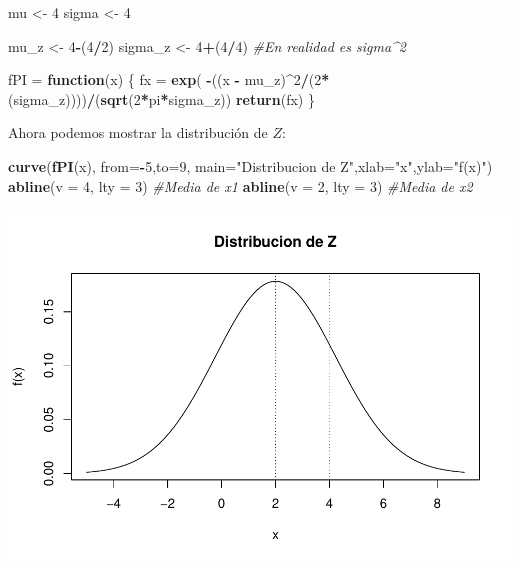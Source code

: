 \documentclass[
]{article}
\newenvironment{Shaded}{\begin{snugshade}}{\end{snugshade}}
\newcommand{\AttributeTok}[1]{\textcolor[rgb]{0.13,0.29,0.53}{#1}}
\newcommand{\CommentTok}[1]{\textcolor[rgb]{0.56,0.35,0.01}{\textit{#1}}}
\newcommand{\ControlFlowTok}[1]{\textcolor[rgb]{0.13,0.29,0.53}{\textbf{#1}}}
\newcommand{\DecValTok}[1]{\textcolor[rgb]{0.00,0.00,0.81}{#1}}
\newcommand{\FunctionTok}[1]{\textcolor[rgb]{0.13,0.29,0.53}{\textbf{#1}}}
\newcommand{\NormalTok}[1]{#1}
\newcommand{\OtherTok}[1]{\textcolor[rgb]{0.56,0.35,0.01}{#1}}
\newcommand{\SpecialCharTok}[1]{\textcolor[rgb]{0.81,0.36,0.00}{\textbf{#1}}}
\newcommand{\StringTok}[1]{\textcolor[rgb]{0.31,0.60,0.02}{#1}}
\begin{document}
\begin{Shaded}
\begin{Highlighting}[]
\NormalTok{mu }\OtherTok{\textless{}{-}} \DecValTok{4}
\NormalTok{sigma }\OtherTok{\textless{}{-}} \DecValTok{4}

\NormalTok{mu\_z }\OtherTok{\textless{}{-}} \DecValTok{4}\SpecialCharTok{{-}}\NormalTok{(}\DecValTok{4}\SpecialCharTok{/}\DecValTok{2}\NormalTok{)}
\NormalTok{sigma\_z }\OtherTok{\textless{}{-}} \DecValTok{4}\SpecialCharTok{+}\NormalTok{(}\DecValTok{4}\SpecialCharTok{/}\DecValTok{4}\NormalTok{) }\CommentTok{\#En realidad es sigma\^{}2}

\NormalTok{fPI }\OtherTok{=} \ControlFlowTok{function}\NormalTok{(x)}
\NormalTok{\{}
\NormalTok{  fx }\OtherTok{=} \FunctionTok{exp}\NormalTok{( }\SpecialCharTok{{-}}\NormalTok{((x }\SpecialCharTok{{-}}\NormalTok{ mu\_z)}\SpecialCharTok{\^{}}\DecValTok{2}\SpecialCharTok{/}\NormalTok{(}\DecValTok{2}\SpecialCharTok{*}\NormalTok{(sigma\_z))))}\SpecialCharTok{/}\NormalTok{(}\FunctionTok{sqrt}\NormalTok{(}\DecValTok{2}\SpecialCharTok{*}\NormalTok{pi}\SpecialCharTok{*}\NormalTok{sigma\_z))}
  \FunctionTok{return}\NormalTok{(fx)}
\NormalTok{\}}
\end{Highlighting}
\end{Shaded}

Ahora podemos mostrar la distribución de \(Z\):

\begin{Shaded}
\begin{Highlighting}[]
\FunctionTok{curve}\NormalTok{(}\FunctionTok{fPI}\NormalTok{(x), }\AttributeTok{from=}\SpecialCharTok{{-}}\DecValTok{5}\NormalTok{,}\AttributeTok{to=}\DecValTok{9}\NormalTok{, }\AttributeTok{main=}\StringTok{"Distribucion de Z"}\NormalTok{,}\AttributeTok{xlab=}\StringTok{"x"}\NormalTok{,}\AttributeTok{ylab=}\StringTok{"f(x)"}\NormalTok{)}
\FunctionTok{abline}\NormalTok{(}\AttributeTok{v =} \DecValTok{4}\NormalTok{, }\AttributeTok{lty =} \DecValTok{3}\NormalTok{) }\CommentTok{\#Media de x1}
\FunctionTok{abline}\NormalTok{(}\AttributeTok{v =} \DecValTok{2}\NormalTok{, }\AttributeTok{lty =} \DecValTok{3}\NormalTok{) }\CommentTok{\#Media de x2}
\end{Highlighting}
\end{Shaded}

\includegraphics{tarea2_files/figure-latex/unnamed-chunk-22-1.pdf}
\end{document}
